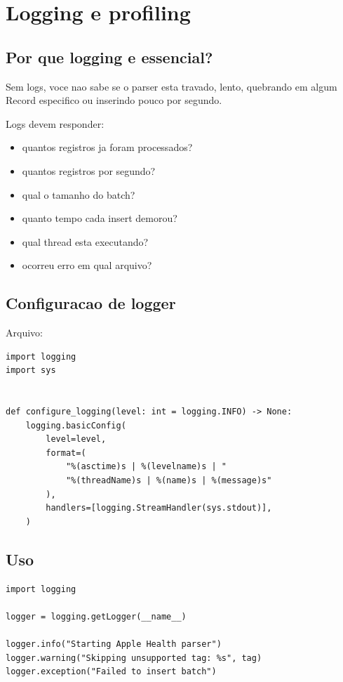 \chapter{Logging e profiling}

\section{Por que logging e essencial?}

Sem logs, voce nao sabe se o parser esta travado, lento, quebrando em algum Record especifico ou inserindo pouco por segundo.

Logs devem responder:

\begin{itemize}
  \item quantos registros ja foram processados?
  \item quantos registros por segundo?
  \item qual o tamanho do batch?
  \item quanto tempo cada insert demorou?
  \item qual thread esta executando?
  \item ocorreu erro em qual arquivo?
\end{itemize}

\section{Configuracao de logger}

Arquivo: 

\begin{lstlisting}[style=devbutterpython]
import logging
import sys


def configure_logging(level: int = logging.INFO) -> None:
    logging.basicConfig(
        level=level,
        format=(
            "%(asctime)s | %(levelname)s | "
            "%(threadName)s | %(name)s | %(message)s"
        ),
        handlers=[logging.StreamHandler(sys.stdout)],
    )
\end{lstlisting}

\section{Uso}

\begin{lstlisting}[style=devbutterpython]
import logging

logger = logging.getLogger(__name__)

logger.info("Starting Apple Health parser")
logger.warning("Skipping unsupported tag: %s", tag)
logger.exception("Failed to insert batch")
\end{lstlisting}


